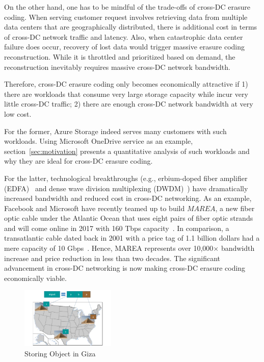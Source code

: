 On the other hand, one has to be mindful of the trade-offs of cross-DC erasure coding. When serving customer request involves retrieving data from multiple data centers that are geographically distributed, there is additional cost in terms of cross-DC network traffic and latency. Also, when catastrophic data center failure does occur, recovery of lost data would trigger massive erasure coding reconstruction. While it is throttled and prioritized based on demand, the reconstruction inevitably requires massive cross-DC network bandwidth.

Therefore, cross-DC erasure coding only becomes economically attractive if 1) there are workloads that consume very large storage capacity while incur very little cross-DC traffic; 2) there are enough cross-DC network bandwidth at very low cost.

For the former, Azure Storage indeed serves many customers with such workloads. Using Microsoft OneDrive service as an example, section~\ref{sec:motivation} presents a quantitative analysis of such workloads and why they are ideal for cross-DC erasure coding.

For the latter, technological breakthroughs (e.g., erbium-doped fiber amplifier (EDFA)~\cite{mears1986low} and dense wave division multiplexing (DWDM)~\cite{zhu2011112}) have dramatically increased bandwidth and reduced cost in cross-DC networking. As an example, Facebook and Microsoft have recently teamed up to build $MAREA$, a new fiber optic cable under the Atlantic Ocean that uses eight pairs of fiber optic strands and will come online in 2017 with 160 Tbps capacity~\cite{bib:MAREA1, bib:MAREA2}. In comparison, a transatlantic cable dated back in 2001 with a price tag of 1.1 billion dollars had a mere capacity of 10 Gbps~\cite{bib:FA-1}. Hence, MAREA represents over 10,000$\times$ bandwidth increase and price reduction in less than two decades. The significant advancement in cross-DC networking is now making cross-DC erasure coding economically viable.


\begin{figure}[tp]
\centering
\includegraphics[width=0.4\textwidth]{images/giza_example_crop_fit}
\caption{Storing Object in Giza}
\label{fig:giza_example}
\end{figure}

